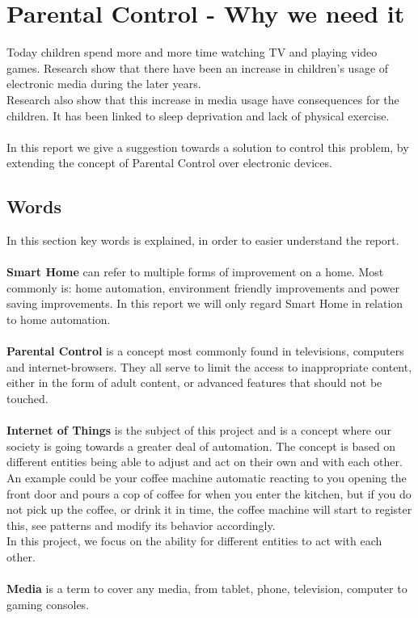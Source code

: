 \chapter{Parental Control - Why we need it}
Today children spend more and more time watching TV and playing video games. Research show that there have been an increase in children's usage of electronic media during the later years. \citep{sundhedsstyrelsen}\\
Research also show that this increase in media usage have consequences for the children. It has been linked to sleep deprivation\citep{bmcPublicHealth} and lack of physical exercise\citep{bmcPublicHealth}.\\
\\
In this report we give a suggestion towards a solution to control this problem, by extending the concept of Parental Control over electronic devices.

\section{Words}
In this section key words is explained, in order to easier understand the report.\\
\\
\textbf{Smart Home} can refer to multiple forms of improvement on a home. Most commonly is: home automation, environment friendly improvements and power saving improvements. In this report we will only regard Smart Home in relation to home automation.\\
\\
\textbf{Parental Control} is a concept most commonly found in televisions, computers and internet-browsers. They all serve to limit the access to inappropriate content, either in the form of adult content, or advanced features that should not be touched.\\
\\
\textbf{Internet of Things} is the subject of this project and is a concept where our society is going towards a greater deal of automation. The concept is based on different entities being able to adjust and act on their own and with each other. An example could be your coffee machine automatic reacting to you opening the front door and pours a cop of coffee for when you enter the kitchen, but if you do not pick up the coffee, or drink it in time, the coffee machine will start to register this, see patterns and modify its behavior accordingly.\citep{internetOfThings}\\
In this project, we focus on the ability for different entities to act with each other. \\
\\
\textbf{Media} is a term to cover any media, from tablet, phone, television, computer to gaming consoles.

